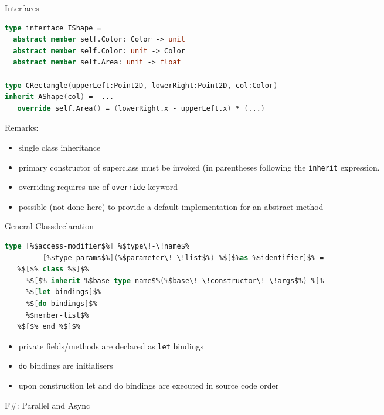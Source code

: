 \documentclass{beamer}
\newcommand{\Blue}[1]{\color{blue}#1\color{black}\xspace}
\begin{document}
\begin{frame}[fragile]{Interfaces}
\begin{lstlisting}[language=FSharp, escapechar=\%]
type interface IShape =
  abstract member self.Color: Color -> unit
  abstract member self.Color: unit -> Color
  abstract member self.Area: unit -> float

type CRectangle(upperLeft:Point2D, lowerRight:Point2D, col:Color) 
inherit AShape(col) =  ...
   override self.Area() = (lowerRight.x - upperLeft.x) * (...)
\end{lstlisting}

\Blue{Remarks:}
\begin{overlayarea}{\textwidth}{0.6\textheight}
\begin{itemize}
 \item<+-> single class inheritance
 \item<+-> primary constructor of superclass must be invoked (in
   parentheses following the \lstinline!inherit! expression.
 \item<+-> overriding requires use of \lstinline!override! keyword 
 \item<+-> possible (not done here) to provide a default
   implementation for an abstract method
\end{itemize}
\end{overlayarea}
\end{frame}

\begin{frame}[fragile]{General Classdeclaration}

\begin{lstlisting}[language=FSharp, escapechar=\%]
type [%$access-modifier$%] %$type\!-\!name$% 
         [%$type-params$%](%$parameter\!-\!list$%) %$[$%as %$identifier]$% =
   %$[$% class %$]$%
     %$[$% inherit %$base-type-name$%(%$base\!-\!constructor\!-\!args$%) %]%
     %$[let-bindings]$%
     %$[do-bindings]$%
     %$member-list$%
   %$[$% end %$]$%
\end{lstlisting}

\begin{itemize}
  \item private fields/methods are declared as \lstinline{let} bindings
  \item \lstinline!do! bindings are initialisers
  \item upon construction let and do bindings are executed in source code order
\end{itemize}
\end{frame}

\begin{frame}{F\#: Parallel and Async}
\end{frame}
\end{document}

